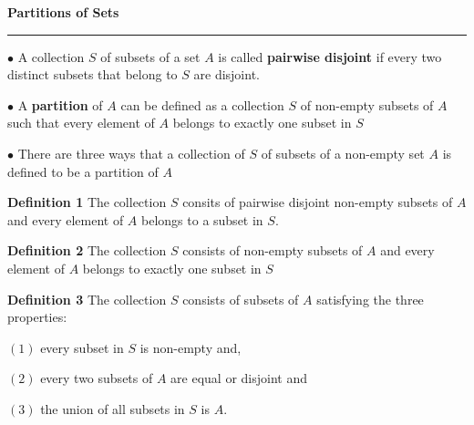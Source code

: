 {\bf Partitions of Sets}
\hrule
\vskip 6pt

$\bullet$ A collection $S$ of subsets of a set $A$ is called {\bf pairwise disjoint} if every two distinct subsets that belong to $S$ are disjoint.
\vskip 1pc

$\bullet$ A {\bf partition} of $A$ can be defined as a collection $S$ of non-empty subsets of $A$ such that every element of $A$ belongs to exactly one subset in $S$
\vskip 1pc

$\bullet$ There are three ways that a collection of $S$ of subsets of a non-empty set $A$ is defined to be a partition of $A$
\vskip 1mm

{\bf Definition 1} The collection $S$ consits of pairwise disjoint non-empty subsets of $A$ and every element of $A$ belongs to a subset in $S$.
\vskip 1mm

{\bf Definition 2} The collection $S$ consists of non-empty subsets of $A$ and every element of $A$ belongs to exactly one subset in $S$
\vskip 1mm

{\bf Definition 3} The collection $S$ consists of subsets of $A$ satisfying the three properties:
\vskip 1mm

\centerline{$(1)$ every subset in $S$ is non-empty and,}
\vskip 1mm

\centerline{$(2)$ every two subsets of $A$ are equal or disjoint and}
\vskip 1mm

\centerline{$(3)$ the union of all subsets in $S$ is $A$.}

\vfill\eject

